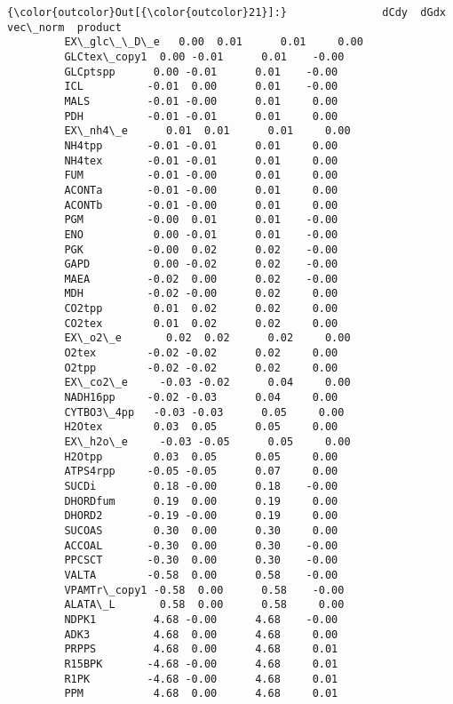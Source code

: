 \documentclass[11pt]{article}
\begin{document}
\begin{Verbatim}[commandchars=\\\{\}]
{\color{outcolor}Out[{\color{outcolor}21}]:}               dCdy  dGdx  vec\_norm  product
         EX\_glc\_\_D\_e   0.00  0.01      0.01     0.00
         GLCtex\_copy1  0.00 -0.01      0.01    -0.00
         GLCptspp      0.00 -0.01      0.01    -0.00
         ICL          -0.01  0.00      0.01    -0.00
         MALS         -0.01 -0.00      0.01     0.00
         PDH          -0.01 -0.01      0.01     0.00
         EX\_nh4\_e      0.01  0.01      0.01     0.00
         NH4tpp       -0.01 -0.01      0.01     0.00
         NH4tex       -0.01 -0.01      0.01     0.00
         FUM          -0.01 -0.00      0.01     0.00
         ACONTa       -0.01 -0.00      0.01     0.00
         ACONTb       -0.01 -0.00      0.01     0.00
         PGM          -0.00  0.01      0.01    -0.00
         ENO           0.00 -0.01      0.01    -0.00
         PGK          -0.00  0.02      0.02    -0.00
         GAPD          0.00 -0.02      0.02    -0.00
         MAEA         -0.02  0.00      0.02    -0.00
         MDH          -0.02 -0.00      0.02     0.00
         CO2tpp        0.01  0.02      0.02     0.00
         CO2tex        0.01  0.02      0.02     0.00
         EX\_o2\_e       0.02  0.02      0.02     0.00
         O2tex        -0.02 -0.02      0.02     0.00
         O2tpp        -0.02 -0.02      0.02     0.00
         EX\_co2\_e     -0.03 -0.02      0.04     0.00
         NADH16pp     -0.02 -0.03      0.04     0.00
         CYTBO3\_4pp   -0.03 -0.03      0.05     0.00
         H2Otex        0.03  0.05      0.05     0.00
         EX\_h2o\_e     -0.03 -0.05      0.05     0.00
         H2Otpp        0.03  0.05      0.05     0.00
         ATPS4rpp     -0.05 -0.05      0.07     0.00
         SUCDi         0.18 -0.00      0.18    -0.00
         DHORDfum      0.19  0.00      0.19     0.00
         DHORD2       -0.19 -0.00      0.19     0.00
         SUCOAS        0.30  0.00      0.30     0.00
         ACCOAL       -0.30  0.00      0.30    -0.00
         PPCSCT       -0.30  0.00      0.30    -0.00
         VALTA        -0.58  0.00      0.58    -0.00
         VPAMTr\_copy1 -0.58  0.00      0.58    -0.00
         ALATA\_L       0.58  0.00      0.58     0.00
         NDPK1         4.68 -0.00      4.68    -0.00
         ADK3          4.68  0.00      4.68     0.00
         PRPPS         4.68  0.00      4.68     0.01
         R15BPK       -4.68 -0.00      4.68     0.01
         R1PK         -4.68 -0.00      4.68     0.01
         PPM           4.68  0.00      4.68     0.01
\end{Verbatim}
            
\end{document}

